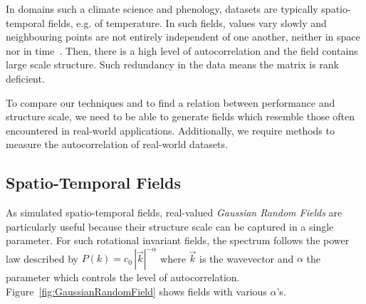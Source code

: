 \documentclass[ijgi,article,submit,moreauthors,pdftex,10pt,a4paper]{Definitions/mdpi}
\begin{document}

In domains such a climate science and phenology, datasets are typically spatio-temporal fields, e.g. of temperature. In such fields, values vary slowly and neighbouring points are not entirely independent of one another, neither in space nor in time~\cite{Eshel2011}. Then, there is a high level of autocorrelation and the field contains large scale structure. Such redundancy in the data means the matrix is rank deficient.

To compare our techniques and to find a relation between performance and structure scale, we need to be able to generate fields which resemble those often encountered in real-world applications. Additionally, we require methods to measure the autocorrelation of real-world datasets.

\subsection{Spatio-Temporal Fields}
\label{sec:Materials and Methods/Spatio-Temporal Fields}

As simulated spatio-temporal fields, real-valued \textit{Gaussian Random Fields} are particularly useful because their structure scale can be captured in a single parameter. For such rotational invariant fields, the spectrum follows the power law described by $P(k) = c_{0} \, |\vec{k}|^{-\alpha}$ where $\vec{k}$ is the wavevector and $\alpha$ the parameter which controls the level of autocorrelation. Figure~\ref{fig:GaussianRandomField} shows fields with various $\alpha$'s.
\end{document}
